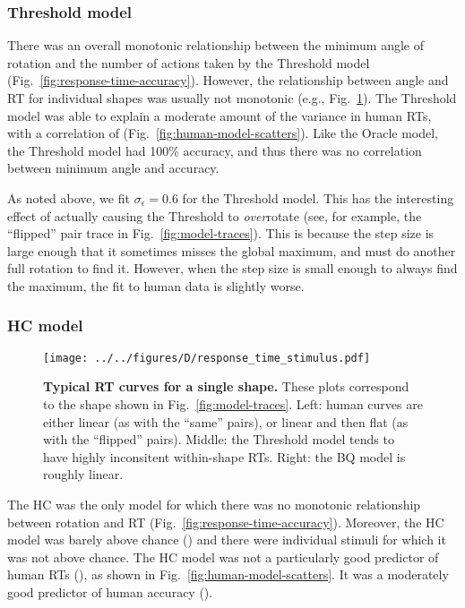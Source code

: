 \documentclass[10pt,letterpaper]{article}
\newcommand{\Oc}[0]{Oracle}
\newcommand{\Th}[0]{Threshold}
\newcommand{\Hc}[0]{HC}
\newcommand{\Bq}[0]{BQ}
\begin{document}
\subsubsection{\Th{} model}

There was an overall monotonic relationship between the minimum angle
of rotation and the number of actions taken by the \Th{} model
(Fig.~\ref{fig:response-time-accuracy}). However, the relationship
between angle and RT for individual shapes was usually not monotonic
(e.g., Fig.~\ref{fig:response-time-stimulus}).  The \Th{} model was
able to explain a moderate amount of the variance in human RTs, with a
correlation of \ThTimeCorr{}
(Fig.~\ref{fig:human-model-scatters}). Like the \Oc{} model, the \Th{}
model had 100\% accuracy, and thus there was no correlation between
minimum angle and accuracy.

As noted above, we fit $\sigma_\epsilon=0.6$ for the \Th{} model. This
has the interesting effect of actually causing the \Th{} to
\textit{over}rotate (see, for example, the ``flipped'' pair trace in
Fig.~\ref{fig:model-traces}). This is because the step size is large
enough that it sometimes misses the global maximum, and must do
another full rotation to find it. However, when the step size is small
enough to always find the maximum, the fit to human data is slightly
worse.

\subsubsection{\Hc{} model}

\begin{figure}[t]
  \begin{center}
    \texttt{[image: ../../figures/D/response\_time\_stimulus.pdf]}
    \caption{\textbf{Typical RT curves for a single shape.}  These
      plots correspond to the shape shown in
      Fig.~\ref{fig:model-traces}. Left: human curves are either
      linear (as with the ``same'' pairs), or linear and then flat (as
      with the ``flipped'' pairs). Middle: the \Th{} model tends to
      have highly inconsitent within-shape RTs. Right: the \Bq{} model
      is roughly linear.}
    \label{fig:response-time-stimulus}
  \end{center}
\end{figure}

The \Hc{} was the only model for which there was no monotonic
relationship between rotation and RT
(Fig.~\ref{fig:response-time-accuracy}). Moreover, the \Hc{} model was
barely above chance (\HcAccuracy{}) and there were \HcNumChance{}
individual stimuli for which it was not above chance. The \Hc{} model
was not a particularly good predictor of human RTs (\HcTimeCorr{}), as
shown in Fig.~\ref{fig:human-model-scatters}. It was a moderately good
predictor of human accuracy (\HcAccuracyCorr{}).
\end{document}
